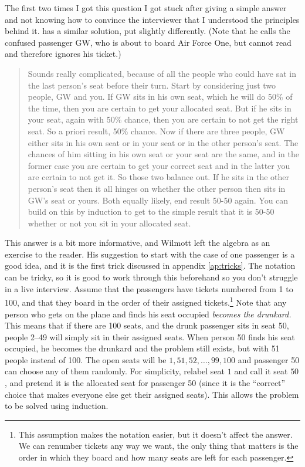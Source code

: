 \documentclass[a4paper]{article}
\begin{document}
The first two times I got this question I got stuck after giving a simple answer and not knowing how to convince the interviewer that I understood the principles behind it.
\citet{WilmottFAQ} has a similar solution, put slightly differently. (Note that he calls the confused passenger GW, who is about to board Air Force One, but cannot read and therefore ignores his ticket.)
\begin{quote}
Sounds really complicated, because of all the people
who could have sat in the last person’s seat before
their turn. Start by considering just two people, GW and
you. If GW sits in his own seat, which he will do 50\%
of the time, then you are certain to get your allocated
seat. But if he sits in your seat, again with 50\% chance,
then you are certain to not get the right seat. So a priori
result, 50\% chance. Now if there are three people, GW
either sits in his own seat or in your seat or in the
other person’s seat. The chances of him sitting in his
own seat or your seat are the same, and in the former
case you are certain to get your correct seat and in
the latter you are certain to not get it. So those two
balance out. If he sits in the other person’s seat then
it all hinges on whether the other person then sits in
GW’s seat or yours. Both equally likely, end result 50-50
again. You can build on this by induction to get to the
simple result that it is 50-50 whether or not you sit in
your allocated seat.
\end{quote}
This answer is a bit more informative, and Wilmott left the algebra as an exercise to the reader.
His suggestion to start with the case of one passenger is a good idea, and it is the first trick discussed in appendix \ref{ap:tricks}.
The notation can be tricky, so it is good to work through this beforehand so you don't struggle in a live interview.
Assume that the passengers have tickets numbered from 1 to 100, and that they board in the order of their assigned tickets.\footnote{This assumption makes the notation easier, but it doesn't affect the answer. We can renumber tickets any way we want, the only thing that matters is the order in which they board and how many seats are left for each passenger.}
Note that any person who gets on the plane and finds his seat occupied \emph{becomes the drunkard.}
This means that if there are 100 seats, and the drunk passenger sits in seat 50, people 2--49 will simply sit in their assigned seats.
When person 50 finds his seat occupied, he becomes the drunkard and the problem still exists, but with 51 people instead of 100. The open seats will be
$1, 51,52,\ldots,99,100$
and passenger 50 can choose any of them randomly. For simplicity,  relabel seat $1$ and call it seat $50$, and pretend it is the allocated seat for passenger 50 (since it is the ``correct'' choice that makes everyone else get their assigned seats).
This allows the problem to be solved using induction.
\end{document}
